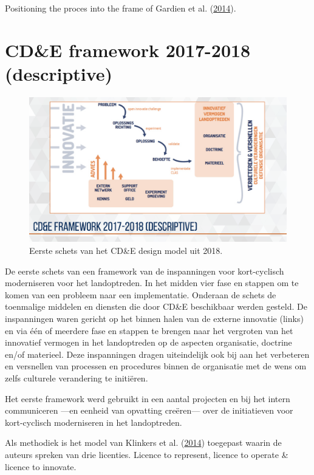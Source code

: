 \documentclass[
]{book}
\begin{document}
Positioning the proces into the frame of Gardien et al. (\protect\hyperlink{ref-gardien_changing_2014}{2014}).

\hypertarget{cde-framework-2017-2018-descriptive}{%
\section{CD\&E framework 2017-2018 (descriptive)}\label{cde-framework-2017-2018-descriptive}}

\begin{figure}

{\centering \includegraphics[width=0.5\linewidth]{data/keynote-slides/20200430-CDE-Designprocess/20200430-CDE-Designprocess.020} 

}

\caption{Eerste schets van het CD\&E design model uit 2018. }\label{fig:unnamed-chunk-16}
\end{figure}

De eerste schets van een framework van de inspanningen voor kort-cyclisch moderniseren voor het landoptreden. In het midden vier fase en stappen om te komen van een probleem naar een implementatie. Onderaan de schets de toenmalige middelen en diensten die door CD\&E beschikbaar werden gesteld. De inspanningen waren gericht op het binnen halen van de externe innovatie (links) en via één of meerdere fase en stappen te brengen naar het vergroten van het innovatief vermogen in het landoptreden op de aspecten organisatie, doctrine en/of materieel. Deze inspanningen dragen uiteindelijk ook bij aan het verbeteren en versnellen van processen en procedures binnen de organisatie met de wens om zelfs culturele verandering te initiëren.

Het eerste framework werd gebruikt in een aantal projecten en bij het intern communiceren ---en eenheid van opvatting creëren--- over de initiatieven voor kort-cyclisch moderniseren in het landoptreden.

Als methodiek is het model van Klinkers et al. (\protect\hyperlink{ref-klinkers_navigeren_2014}{2014}) toegepast waarin de auteurs spreken van drie licenties. Licence to represent, licence to operate \& licence to innovate.
\end{document}
